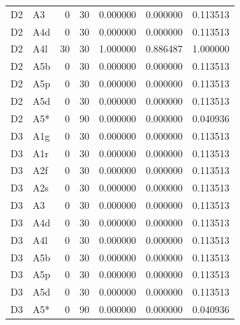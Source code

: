 \begin{tabular}{llrrrrr}
D2 & A3 & 0 & 30 & 0.000000 & 0.000000 & 0.113513 \\
D2 & A4d & 0 & 30 & 0.000000 & 0.000000 & 0.113513 \\
D2 & A4l & 30 & 30 & 1.000000 & 0.886487 & 1.000000 \\
D2 & A5b & 0 & 30 & 0.000000 & 0.000000 & 0.113513 \\
D2 & A5p & 0 & 30 & 0.000000 & 0.000000 & 0.113513 \\
D2 & A5d & 0 & 30 & 0.000000 & 0.000000 & 0.113513 \\
D2 & A5* & 0 & 90 & 0.000000 & 0.000000 & 0.040936 \\
D3 & A1g & 0 & 30 & 0.000000 & 0.000000 & 0.113513 \\
D3 & A1r & 0 & 30 & 0.000000 & 0.000000 & 0.113513 \\
D3 & A2f & 0 & 30 & 0.000000 & 0.000000 & 0.113513 \\
D3 & A2s & 0 & 30 & 0.000000 & 0.000000 & 0.113513 \\
D3 & A3 & 0 & 30 & 0.000000 & 0.000000 & 0.113513 \\
D3 & A4d & 0 & 30 & 0.000000 & 0.000000 & 0.113513 \\
D3 & A4l & 0 & 30 & 0.000000 & 0.000000 & 0.113513 \\
D3 & A5b & 0 & 30 & 0.000000 & 0.000000 & 0.113513 \\
D3 & A5p & 0 & 30 & 0.000000 & 0.000000 & 0.113513 \\
D3 & A5d & 0 & 30 & 0.000000 & 0.000000 & 0.113513 \\
D3 & A5* & 0 & 90 & 0.000000 & 0.000000 & 0.040936 \\
\bottomrule
\end{tabular}
